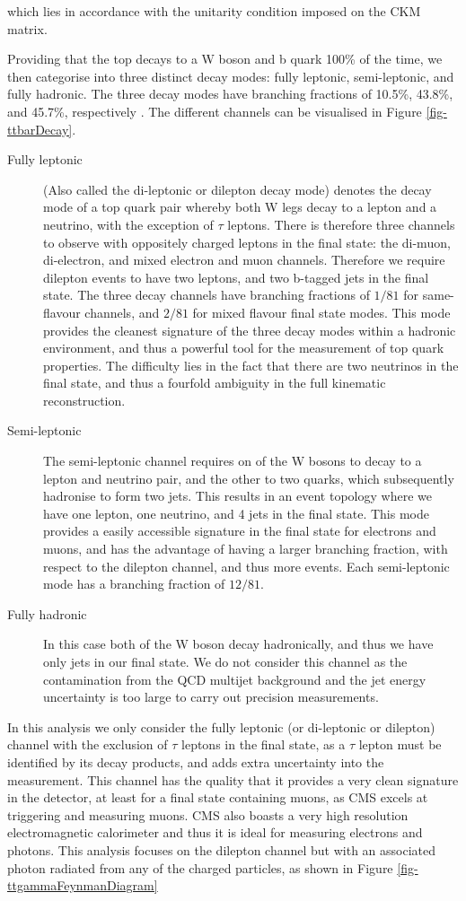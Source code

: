 which lies in accordance with the unitarity condition imposed on the CKM matrix. 

Providing that the top decays to a W boson and b quark 100\% of the time, we then categorise into three distinct decay modes: fully leptonic, semi-leptonic, and fully hadronic. The three decay modes have branching fractions of 10.5\%, 43.8\%, and 45.7\%, respectively \cite{PhysRevD.86.010001}. The different channels can be visualised in Figure \ref{fig-ttbarDecay}.

\begin{description}
	\item[Fully leptonic] (Also called the di-leptonic or dilepton decay mode) denotes the decay mode of a top quark pair whereby both W legs decay to a lepton and a neutrino, with the exception of $\tau$ leptons. There is therefore three channels to observe with oppositely charged leptons in the final state: the di-muon, di-electron, and mixed electron and muon channels. Therefore we require dilepton events to have two leptons, and two b-tagged jets in the final state. The three decay channels have branching fractions of $1/81$ for same-flavour channels, and $2/81$ for mixed flavour final state modes. This mode provides the cleanest signature of the three decay modes within a hadronic environment, and thus a powerful tool for the measurement of top quark properties. The difficulty lies in the fact that there are two neutrinos in the final state, and thus a fourfold ambiguity in the full kinematic reconstruction.
	\item[Semi-leptonic] The semi-leptonic channel requires on of the W bosons to decay to a lepton and neutrino pair, and the other to two quarks, which subsequently hadronise to form two jets. This results in an event topology where we have one lepton, one neutrino, and 4 jets in the final state. This mode provides a easily accessible signature in the final state for electrons and muons, and has the advantage of having a larger branching fraction, with respect to the dilepton channel, and thus more events. Each semi-leptonic mode has a branching fraction of $12/81$.
	\item[Fully hadronic] In this case both of the W boson decay hadronically, and thus we have only jets in our final state. We do not consider this channel as the contamination from the QCD multijet background and the jet energy uncertainty is too large to carry out precision measurements. 
\end{description}

In this analysis we only consider the fully leptonic (or di-leptonic or dilepton) channel with the exclusion of $\tau$ leptons in the final state, as a $\tau$ lepton must be identified by its decay products, and adds extra uncertainty into the measurement. This channel has the quality that it provides a very clean signature in the detector, at least for a final state containing muons, as CMS excels at triggering and measuring muons. CMS also boasts a very high resolution electromagnetic calorimeter and thus it is ideal for measuring electrons and photons. This analysis focuses on the dilepton channel but with an associated photon radiated from any of the charged particles, as shown in Figure \ref{fig-ttgammaFeynmanDiagram}

